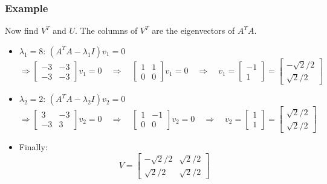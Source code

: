 \documentclass[10pt]{beamer}
\begin{document}
\begin{frame}
\frametitle{Example}
Now find $V^T$ and $U$.  The columns of $V^T$ are the eigenvectors of $A^T A$.
\begin{itemize}
    \item $\lambda_1=8$:  $(A^T A - \lambda_1 I) v_1 = 0$
\[
\Rightarrow 
\begin{bmatrix}
-3 & - 3\\
-3 & - 3
\end{bmatrix}
v_1 = 0
\quad
\Rightarrow 
\quad
\begin{bmatrix}
1 & 1\\
0 & 0
\end{bmatrix}
v_1 = 0
\quad
\Rightarrow 
\quad
v_1 = 
\begin{bmatrix}
-1 \\
1
\end{bmatrix}
=
\begin{bmatrix}
-\sqrt{2}/2\\
\sqrt{2}/2
\end{bmatrix}
\]
    \item $\lambda_2=2$:  $(A^T A - \lambda_2 I) v_2 = 0$
\[
\Rightarrow 
\begin{bmatrix}
 3 & - 3\\
-3 &   3
\end{bmatrix}
v_2 = 0
\quad
\Rightarrow 
\quad
\begin{bmatrix}
1 & -1\\
0 & 0
\end{bmatrix}
v_2 = 0
\quad
\Rightarrow 
\quad
v_2 = 
\begin{bmatrix}
1 \\
1
\end{bmatrix}
=
\begin{bmatrix}
\sqrt{2}/2\\
\sqrt{2}/2
\end{bmatrix}
\]
    \item Finally:
\[
V=
\begin{bmatrix}
-\sqrt{2}/2 & \sqrt{2}/2\\
\sqrt{2}/2  & \sqrt{2}/2
\end{bmatrix}
\]
\end{itemize}
\end{frame}
\end{document}
